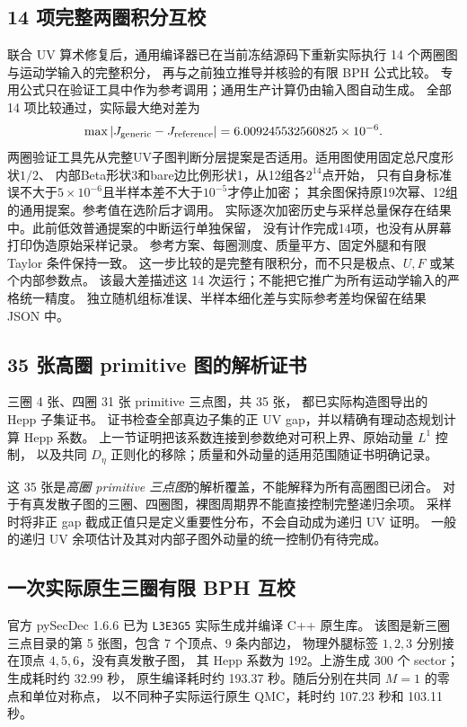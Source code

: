 \subsection{14 项完整两圈积分互校}

联合 UV 算术修复后，通用编译器已在当前冻结源码下重新实际执行
14 个两圈图与运动学输入的完整积分，
再与之前独立推导并核验的有限 BPH 公式比较。
专用公式只在验证工具中作为参考调用；通用生产计算仍由输入图自动生成。
全部 14 项比较通过，实际最大绝对差为
\[
 \max |J_{\rm generic}-J_{\rm reference}|
 =6.009245532560825\times10^{-6}.
\]
两圈验证工具先从完整UV子图判断分层提案是否适用。适用图使用固定总尺度形状$1/2$、
内部Beta形状3和bare边比例形状1，从12组各$2^{14}$点开始，
只有自身标准误不大于$5\times10^{-6}$且半样本差不大于$10^{-5}$才停止加密；
其余图保持原19次幂、12组的通用提案。参考值在选阶后才调用。
实际逐次加密历史与采样总量保存在结果中。此前低效普通提案的中断运行单独保留，
没有计作完成14项，也没有从屏幕打印伪造原始采样记录。
参考方案、每圈测度、质量平方、固定外腿和有限 Taylor 条件保持一致。
这一步比较的是完整有限积分，而不只是极点、$U,F$ 或某个内部参数点。
该最大差描述这 14 次运行；不能把它推广为所有运动学输入的严格统一精度。
独立随机组标准误、半样本细化差与实际参考差均保留在结果 JSON 中。

\subsection{35 张高圈 primitive 图的解析证书}

三圈 4 张、四圈 31 张 primitive 三点图，共 35 张，
都已实际构造图导出的 Hepp 子集证书。
证书检查全部真边子集的正 UV gap，并以精确有理动态规划计算 Hepp 系数。
上一节证明把该系数连接到参数绝对可积上界、原始动量 $L^1$ 控制，
以及共同 $D_\eta$ 正则化的移除；质量和外动量的适用范围随证书明确记录。

这 35 张是\emph{高圈 primitive 三点图}的解析覆盖，不能解释为所有高圈图已闭合。
对于有真发散子图的三圈、四圈图，裸图周期界不能直接控制完整递归余项。
采样时将非正 gap 截成正值只是定义重要性分布，不会自动成为递归 UV 证明。
一般的递归 UV 余项估计及其对内部子图外动量的统一控制仍有待完成。

\subsection{一次实际原生三圈有限 BPH 互校}

官方 pySecDec 1.6.6 已为 \texttt{L3E3G5} 实际生成并编译 C++ 原生库。
该图是新三圈三点目录的第 5 张图，包含 7 个顶点、9 条内部边，
物理外腿标签 $1,2,3$ 分别接在顶点 $4,5,6$，没有真发散子图，
其 Hepp 系数为 192。上游生成 300 个 sector；生成耗时约 32.99 秒，
原生编译耗时约 193.37 秒。随后分别在共同 $M=1$ 的零点和单位对称点，
以不同种子实际运行原生 QMC，耗时约 107.23 秒和 103.11 秒。

